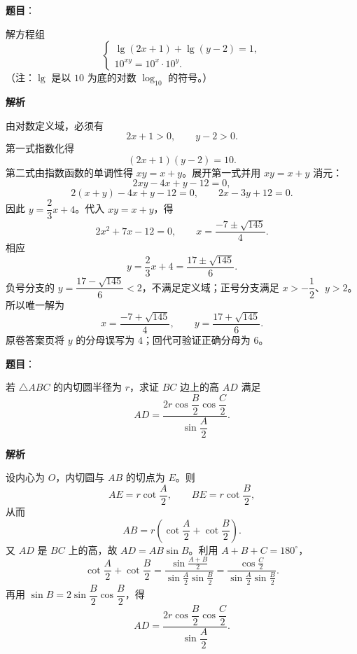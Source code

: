 \begin{answer}

\textbf{题目}：

解方程组
\[
\begin{cases}
\lg(2x+1)+\lg(y-2)=1,\\
10^{xy}=10^x\cdot10^y.
\end{cases}
\]
（注：$\lg$ 是以 $10$ 为底的对数 $\log_{10}$ 的符号。）

\textbf{解析}

由对数定义域，必须有
\[
2x+1>0,\qquad y-2>0.
\]
第一式指数化得
\[
(2x+1)(y-2)=10.
\]
第二式由指数函数的单调性得 $xy=x+y$。展开第一式并用 $xy=x+y$ 消元：
\[
2xy-4x+y-12=0,
\]
\[
2(x+y)-4x+y-12=0,
\qquad 2x-3y+12=0.
\]
因此 $y=\dfrac23x+4$。代入 $xy=x+y$，得
\[
2x^2+7x-12=0,
\qquad x=\frac{-7\pm\sqrt{145}}4.
\]
相应
\[
y=\frac23x+4=\frac{17\pm\sqrt{145}}6.
\]
负号分支的 $y=\dfrac{17-\sqrt{145}}6<2$，不满足定义域；正号分支满足 $x>-\dfrac12$、$y>2$。所以唯一解为
\[
x=\frac{-7+\sqrt{145}}4,\qquad y=\frac{17+\sqrt{145}}6.
\]
原卷答案页将 $y$ 的分母误写为 $4$；回代可验证正确分母为 $6$。


\end{answer}
\begin{answer}

\textbf{题目}：

若 $\triangle ABC$ 的内切圆半径为 $r$，求证 $BC$ 边上的高 $AD$ 满足
\[
AD=\frac{2r\cos\dfrac B2\cos\dfrac C2}{\sin\dfrac A2}.
\]

\textbf{解析}
\nopagebreak[4]
\begin{center}\end{center}
\nopagebreak[4]
设内心为 $O$，内切圆与 $AB$ 的切点为 $E$。则
\[
AE=r\cot\frac A2,\qquad BE=r\cot\frac B2,
\]
从而
\[
AB=r\left(\cot\frac A2+\cot\frac B2\right).
\]
又 $AD$ 是 $BC$ 上的高，故 $AD=AB\sin B$。利用 $A+B+C=180^\circ$，
\[
\cot\frac A2+\cot\frac B2
=\frac{\sin\frac{A+B}{2}}{\sin\frac A2\sin\frac B2}
=\frac{\cos\frac C2}{\sin\frac A2\sin\frac B2}.
\]
再用 $\sin B=2\sin\dfrac B2\cos\dfrac B2$，得
\[
AD=\frac{2r\cos\dfrac B2\cos\dfrac C2}{\sin\dfrac A2}.
\]


\end{answer}
